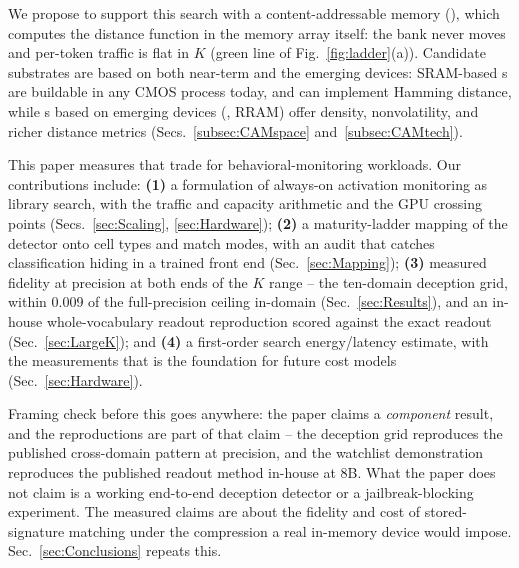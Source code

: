We propose to support this search with a content-addressable memory
(\cam), which computes the distance function in the memory array
itself: the bank never moves and per-token traffic is flat in $K$
(green line of Fig.~\ref{fig:ladder}(a)).
Candidate substrates are based on both near-term and the emerging
devices: SRAM-based \cam{}s are buildable in any CMOS process today,
and can implement Hamming distance, while \cam{}s based on emerging
devices (\fefets, RRAM) offer density, nonvolatility, and richer
distance metrics (Secs.~\ref{subsec:CAMspace}
and~\ref{subsec:CAMtech}).

This paper measures that trade for behavioral-monitoring workloads.
Our contributions include: {\bf (1)} a formulation of always-on activation
monitoring as library search, with the traffic and capacity arithmetic
and the GPU crossing points (Secs.~\ref{sec:Scaling},
\ref{sec:Hardware}); {\bf (2)} a maturity-ladder mapping of the
detector onto \cam cell types and match modes, with an audit that
catches classification hiding in a trained front end
(Sec.~\ref{sec:Mapping}); {\bf (3)} measured fidelity at \cam
precision at both ends of the $K$ range -- the ten-domain deception
grid, within 0.009 \auroc of the full-precision ceiling in-domain
(Sec.~\ref{sec:Results}), and an in-house whole-vocabulary readout
reproduction scored against the exact readout
(Sec.~\ref{sec:LargeK}); and {\bf (4)} a first-order search
energy/latency estimate, with the measurements that is the foundation
for future cost models (Sec.~\ref{sec:Hardware}).

\begin{pnote}
Framing check before this goes anywhere: the paper claims a
\emph{component} result, and the reproductions are part of that claim
-- the deception grid reproduces the published cross-domain pattern at
\cam precision, and the watchlist demonstration reproduces the
published readout method in-house at 8B. What the paper does not claim
is a working end-to-end deception detector or a jailbreak-blocking
experiment. The measured claims are about the fidelity and cost of
stored-signature matching under the compression a real in-memory
device would impose. Sec.~\ref{sec:Conclusions} repeats this.
\end{pnote}
